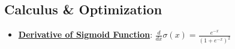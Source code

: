 \documentclass{article}%
\begin{document}
%
\subsection{Calculus \& Optimization}%
\label{subsec:CalculusOptimization}%
\begin{itemize}[leftmargin=*]%
\item \href{https://purdue.brightspace.com/d2l/common/assets/pdfjs-d2l-dist/1.0.14-legacy/web/viewer.html?file=\%2Fcontent\%2Fenforced\%2F1095467-wl.202510.CS.24300.001\%2F04L1-Linear Algebra Primer.pdf\%3Fou\%3D1095467\&lang=en-us\&container=d2l-fileviewer-rendered-pdf\&fullscreen=d2l-fileviewer-rendered-pdf-dialog\&height=667#page=21}{\textbf{Derivative of Sigmoid Function}}: $\frac{d}{dx} \sigma(x) = \frac{e^{-x}}{(1 + e^{-x})^2}$%
\end{itemize}

%
\end{document}
